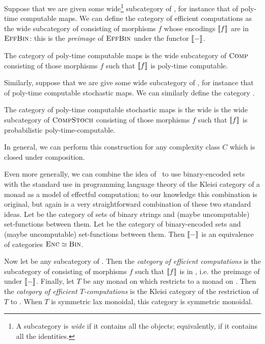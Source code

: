 Suppose that we are given some wide\footnote{A subcategory is \emph{wide} if it
contains all the objects; equivalently, if it contains all the identities.}
subcategory  of , for instance that of poly-time
computable maps. We can define the category  of efficient
computations as the wide subcategory of  consisting of morphisms $f$
whose encodings $\llbracket f \rrbracket$ are in ${\textsc{\text{EffBin}}}$: this is the \emph{preimage}
of ${\textsc{\text{EffBin}}}$ under the functor $\llbracket - \rrbracket$.

\begin{dfn}
  The category  of poly-time computable maps is the wide subcategory
  of ${\textsc{\text{Comp}}}$ consisting of those morphisms $f$ such that $\llbracket f \rrbracket$ is
  poly-time computable.
\end{dfn}

Similarly, suppose that we are give some wide subcategory of
, for instance that of poly-time computable stochastic maps.
We can similarly define the category .

\begin{dfn}
  The category  of poly-time computable stochastic maps is the wide is
  the wide subcategory of ${\textsc{\text{CompStoch}}}$ consisting of those morphisms $f$
  such that $\llbracket f \rrbracket$ is probabilistic poly-time-computable.
\end{dfn}

In general, we can perform this construction for any complexity class $C$ which
is closed under composition.

Even more generally, we can combine the idea of~\cite{pavlovic-2014} to use
binary-encoded sets with the standard use in programming language theory of the
Kleisi category of a monad as a model of effectful computation; to our knowledge
this combination is original, but again is a very straightforward combination of
these two standard ideas. Let  be the category of sets of binary
strings and (maybe uncomputable) set-functions between them. Let  be
the category of binary-encoded sets and (maybe uncomputable) set-functions
between them. Then $\llbracket - \rrbracket$ is an equivalence of categories
${\textsc{\text{Enc}}}\simeq {\textsc{\text{Bin}}}$.

Now let  be any subcategory of . Then the \emph{category
of efficient computations}  is the subcategory of 
consisting of morphisms $f$ such that $\llbracket f \rrbracket$ is in , i.e. the
preimage of  under $\llbracket - \rrbracket$. Finally, let $T$ be any monad on
 which restricts to a monad on . Then the \emph{category of
efficient $T$-computations} is the Kleisi category of the restriction of $T$ to
. When $T$ is symmetric lax monoidal, this category is symmetric
monoidal.


